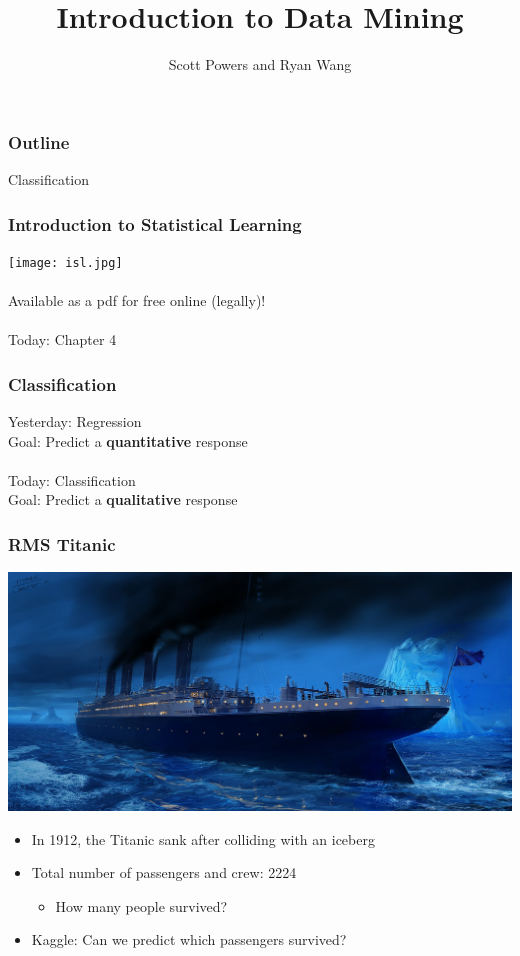 \documentclass{beamer}
\title{Introduction to Data Mining}
\author{Scott Powers and Ryan Wang}
\begin{document}
\begin{frame}
\titlepage
\end{frame}

\begin{frame}
\frametitle{Outline}
Classification
\end{frame}

\begin{frame}
\frametitle{Introduction to Statistical Learning}
\texttt{[image: isl.jpg]}\\~\\
Available as a pdf for free online (legally)!\\~\\
Today: Chapter 4
\end{frame}

\begin{frame}
\frametitle{Classification}
Yesterday: Regression\\
Goal: Predict a {\bf quantitative} response\\~\\
Today: Classification\\
Goal: Predict a {\bf qualitative} response
\end{frame}

\begin{frame}
\frametitle{RMS Titanic}
\begin{center}
\includegraphics[scale = .15]{titanic.jpg}
\end{center}
\begin{itemize}
\item In 1912, the Titanic sank after colliding with an iceberg
\item Total number of passengers and crew: 2224
\begin{itemize}
\item How many people survived? 
\end{itemize}
\item Kaggle: Can we predict which passengers survived?
\end{itemize}
\end{frame}
\end{document}
